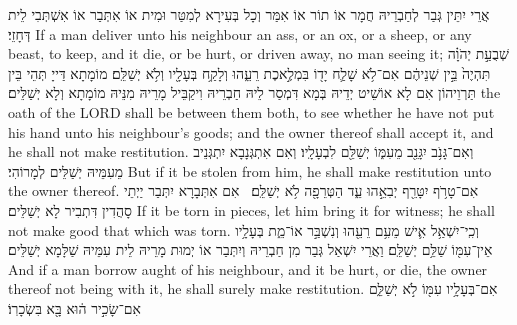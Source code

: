{{אֲרֵי יִתֵּין גְּבַר לְחַבְרֵיהּ חֲמָר אוֹ תוֹר אוֹ אִמַּר וְכָל בְּעִירָא לְמִטַּר וּמִית אוֹ אִתְּבַר אוֹ אִשְׁתְּבִי לֵית דְּחָזֵי׃}
{If a man deliver unto his neighbour an ass, or an ox, or a sheep, or any beast, to keep, and it die, or be hurt, or driven away, no man seeing it;}{}
{שְׁבֻעַ֣ת יְהֹוָ֗ה תִּהְיֶה֙ בֵּ֣ין שְׁנֵיהֶ֔ם אִם־לֹ֥א שָׁלַ֛ח יָד֖וֹ בִּמְלֶ֣אכֶת רֵעֵ֑הוּ וְלָקַ֥ח בְּעָלָ֖יו וְלֹ֥א יְשַׁלֵּֽם׃
}
{מוֹמָתָא דַּייָ תְּהֵי בֵּין תַּרְוֵיהוֹן אִם לָא אוֹשֵׁיט יְדֵיהּ בְּמָא דִּמְסַר לֵיהּ חַבְרֵיהּ וִיקַבֵּיל מָרֵיהּ מִנֵּיהּ מוֹמָתָא וְלָא יְשַׁלֵּים׃}
{the oath of the LORD shall be between them both, to see whether he have not put his hand unto his neighbour’s goods; and the owner thereof shall accept it, and he shall not make restitution.}{}
{וְאִם־גָּנֹ֥ב יִגָּנֵ֖ב מֵעִמּ֑וֹ יְשַׁלֵּ֖ם לִבְעָלָֽיו׃}
{וְאִם אִתְגְּנָבָא יִתְגְּנֵיב מֵעִמֵּיהּ יְשַׁלֵּים לְמָרוֹהִי׃}
{But if it be stolen from him, he shall make restitution unto the owner thereof.}{}
{אִם־טָרֹ֥ף יִטָּרֵ֖ף יְבִאֵ֣הוּ עֵ֑ד הַטְּרֵפָ֖ה לֹ֥א יְשַׁלֵּֽם׃ \petucha 
{}}
{אִם אִתְּבָרָא יִתְּבַר יַיְתֵי סָהֲדִין דִּתְבִיר לָא יְשַׁלֵּים׃}
{If it be torn in pieces, let him bring it for witness; he shall not make good that which was torn.}{}
{וְכִֽי־יִשְׁאַ֥ל אִ֛ישׁ מֵעִ֥ם רֵעֵ֖הוּ וְנִשְׁבַּ֣ר אוֹ־מֵ֑ת בְּעָלָ֥יו אֵין־עִמּ֖וֹ שַׁלֵּ֥ם יְשַׁלֵּֽם׃
}
{וַאֲרֵי יִשְׁאַל גְּבַר מִן חַבְרֵיהּ וְיִתְּבַר אוֹ יְמוּת מָרֵיהּ לֵית עִמֵּיהּ שַׁלָּמָא יְשַׁלֵּים׃}
{And if a man borrow aught of his neighbour, and it be hurt, or die, the owner thereof not being with it, he shall surely make restitution.}{}
{אִם־בְּעָלָ֥יו עִמּ֖וֹ לֹ֣א יְשַׁלֵּ֑ם אִם־שָׂכִ֣יר ה֔וּא בָּ֖א בִּשְׂכָרֽוֹ׃ \setuma         
}}
